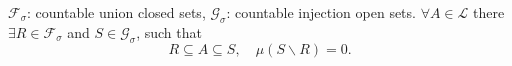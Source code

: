 \begin{remark}
	${\mathcal{F}_\sigma }$: countable union closed sets, ${\mathcal{G}_\sigma }$: countable injection open sets. $ \forall A \in \mathcal{L} $ there $\exists R \in {\mathcal{F}_\sigma }$ and $ S \in {\mathcal{G}_\sigma } $, such that
	\begin{equation}
	R \subseteq A \subseteq S, \quad \mu \left( {S\backslash R} \right) = 0.
	\label{eq.9.19}
	\end{equation}
\end{remark}

 
 
